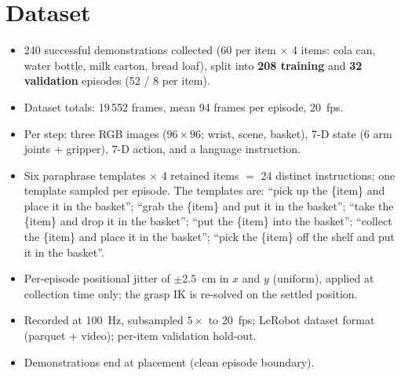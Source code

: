\section{Dataset}
\begin{itemize}
    \item 240 successful demonstrations collected (60 per item $\times$ 4 items:
    cola can, water bottle, milk carton, bread loaf), split into \textbf{208 training}
    and \textbf{32 validation} episodes (52 / 8 per item).
    \item Dataset totals: 19\,552 frames, mean 94 frames per episode, \SI{20}{fps}.
    \item Per step: three RGB images ($96\times96$; wrist, scene, basket), 7-D state
    (6 arm joints + gripper), 7-D action, and a language instruction.
    \item Six paraphrase templates $\times$ 4 retained items $=$ 24 distinct
    instructions; one template sampled per episode. The templates are:
    ``pick up the \{item\} and place it in the basket'';
    ``grab the \{item\} and put it in the basket'';
    ``take the \{item\} and drop it in the basket'';
    ``put the \{item\} into the basket'';
    ``collect the \{item\} and place it in the basket'';
    ``pick the \{item\} off the shelf and put it in the basket''.
    \item Per-episode positional jitter of $\pm$\SI{2.5}{cm} in $x$ and $y$
    (uniform), applied at collection time only; the grasp IK is re-solved on the
    settled position.
    \item Recorded at 100~Hz, subsampled $5\times$ to 20~fps; LeRobot dataset format
    (parquet + video); per-item validation hold-out.
    \item Demonstrations end at placement (clean episode boundary).
\end{itemize}

